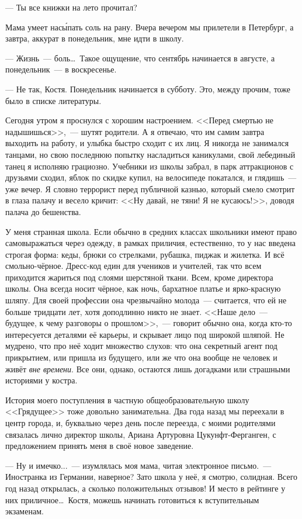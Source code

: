 \documentclass[openany, oneside]{book}
\begin{document}
--- Ты все книжки на лето прочитал?

Мама умеет нас\'{ы}пать соль на рану. Вчера вечером мы прилетели в Петербург, а завтра, аккурат в понедельник, мне идти в школу.

--- Жизнь~--- боль\dots \ Такое ощущение, что сентябрь начинается в августе, а понедельник~--- в воскресенье.

--- Не так, Костя. Понедельник начинается в субботу. Это, между прочим, тоже было в списке литературы.

Сегодня утром я проснулся с хорошим настроением. <<Перед смертью не надышишься>>,~--- шутят родители. А я отвечаю, что им самим завтра выходить на работу, и улыбка быстро сходит с их лиц. Я никогда не занимался танцами, но свою последнюю попытку насладиться каникулами, свой лебединый танец я исполняю грациозно. Учебники из школы забрал, в парк аттракционов с друзьями сходил, яблок по скидке купил, на велосипеде покатался, и глядишь~--- уже вечер. Я словно террорист перед публичной казнью, который смело смотрит в глаза палачу и весело кричит: <<Ну давай, не тяни! Я не кусаюсь!>>, доводя палача до бешенства.

У меня странная школа. Если обычно в средних классах школьники имеют право самовыражаться через одежду, в рамках приличия, естественно, то у нас введена строгая форма: кеды, брюки со стрелками, рубашка, пиджак и жилетка. И всё смольно-чёрное. Дресс-код един для учеников и учителей, так что всем приходится жариться под слоями шерстяной ткани. Всем, кроме директора школы. Она всегда носит чёрное, как ночь, бархатное платье и ярко-красную шляпу. Для своей профессии она чрезвычайно молода~--- считается, что ей не больше тридцати лет, хотя доподлинно никто не знает. <<Наше дело~--- будущее, к чему разговоры о прошлом>>,~--- говорит обычно она, когда кто-то интересуется деталями её карьеры, и скрывает лицо под широкой шляпой. Не мудрено, что про неё ходит множество слухов: что она секретный агент под прикрытием, или пришла из будущего, или же что она вообще не человек и живёт \textit{вне времени}. Все они, однако, остаются лишь догадками или страшными историями у костра.

История моего поступления в частную общеобразовательную школу <<Грядущее>> тоже довольно занимательна. Два года назад мы переехали в центр города, и, буквально через день после переезда, с моими родителями связалась лично директор школы, Ариана Артуровна Цукунфт-Ферганген, с предложением принять меня в своё новое заведение.

--- Ну и имечко...~--- изумлялась моя мама, читая электронное письмо.~--- Иностранка из Германии, наверное? Зато школа у неё, я смотрю, солидная. Всего год назад открылась, а сколько положительных отзывов! И место в рейтинге у них приличное\dots \ Костя, можешь начинать готовиться к вступительным экзаменам.
\end{document}
